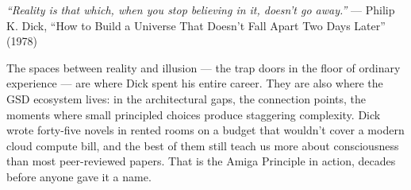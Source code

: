 \documentclass[11pt,letterpaper]{article}
\begin{document}
\vspace{2em}
\begin{quotebox}
\textit{``Reality is that which, when you stop believing in it, doesn't go away.''} --- Philip K. Dick, ``How to Build a Universe That Doesn't Fall Apart Two Days Later'' (1978)

\vspace{0.5em}

The spaces between reality and illusion --- the trap doors in the floor of ordinary experience --- are where Dick spent his entire career. They are also where the GSD ecosystem lives: in the architectural gaps, the connection points, the moments where small principled choices produce staggering complexity. Dick wrote forty-five novels in rented rooms on a budget that wouldn't cover a modern cloud compute bill, and the best of them still teach us more about consciousness than most peer-reviewed papers. That is the Amiga Principle in action, decades before anyone gave it a name.
\end{quotebox}
\end{document}
